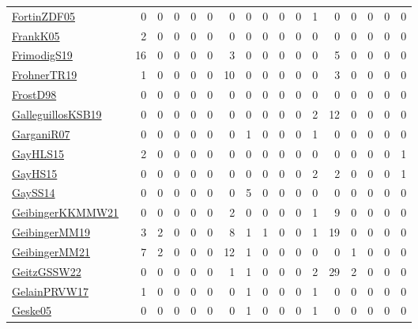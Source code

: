 {\begin{longtable}{l*{16}{r}}
\href{papers/FortinZDF05.pdf}{FortinZDF05}~\cite{FortinZDF05} & 0 & 0 & 0 & 0 & 0 & 0 & 0 & 0 & 0 & 0 & 1 & 0 & 0 & 0 & 0 & 0\\
\href{papers/FrankK05.pdf}{FrankK05}~\cite{FrankK05} & 2 & 0 & 0 & 0 & 0 & 0 & 0 & 0 & 0 & 0 & 0 & 0 & 0 & 0 & 0 & 0\\
\href{papers/FrimodigS19.pdf}{FrimodigS19}~\cite{FrimodigS19} & 16 & 0 & 0 & 0 & 0 & 3 & 0 & 0 & 0 & 0 & 0 & 5 & 0 & 0 & 0 & 0\\
\href{papers/FrohnerTR19.pdf}{FrohnerTR19}~\cite{FrohnerTR19} & 1 & 0 & 0 & 0 & 0 & 10 & 0 & 0 & 0 & 0 & 0 & 3 & 0 & 0 & 0 & 0\\
\href{papers/FrostD98.pdf}{FrostD98}~\cite{FrostD98} & 0 & 0 & 0 & 0 & 0 & 0 & 0 & 0 & 0 & 0 & 0 & 0 & 0 & 0 & 0 & 0\\
\href{papers/GalleguillosKSB19.pdf}{GalleguillosKSB19}~\cite{GalleguillosKSB19} & 0 & 0 & 0 & 0 & 0 & 0 & 0 & 0 & 0 & 0 & 2 & 12 & 0 & 0 & 0 & 0\\
\href{papers/GarganiR07.pdf}{GarganiR07}~\cite{GarganiR07} & 0 & 0 & 0 & 0 & 0 & 0 & 1 & 0 & 0 & 0 & 1 & 0 & 0 & 0 & 0 & 0\\
\href{papers/GayHLS15.pdf}{GayHLS15}~\cite{GayHLS15} & 2 & 0 & 0 & 0 & 0 & 0 & 0 & 0 & 0 & 0 & 0 & 0 & 0 & 0 & 0 & 1\\
\href{papers/GayHS15.pdf}{GayHS15}~\cite{GayHS15} & 0 & 0 & 0 & 0 & 0 & 0 & 0 & 0 & 0 & 0 & 2 & 2 & 0 & 0 & 0 & 1\\
\href{papers/GaySS14.pdf}{GaySS14}~\cite{GaySS14} & 0 & 0 & 0 & 0 & 0 & 0 & 5 & 0 & 0 & 0 & 0 & 0 & 0 & 0 & 0 & 0\\
\href{papers/GeibingerKKMMW21.pdf}{GeibingerKKMMW21}~\cite{GeibingerKKMMW21} & 0 & 0 & 0 & 0 & 0 & 2 & 0 & 0 & 0 & 0 & 1 & 9 & 0 & 0 & 0 & 0\\
\href{papers/GeibingerMM19.pdf}{GeibingerMM19}~\cite{GeibingerMM19} & 3 & 2 & 0 & 0 & 0 & 8 & 1 & 1 & 0 & 0 & 1 & 19 & 0 & 0 & 0 & 0\\
\href{papers/GeibingerMM21.pdf}{GeibingerMM21}~\cite{GeibingerMM21} & 7 & 2 & 0 & 0 & 0 & 12 & 1 & 0 & 0 & 0 & 0 & 0 & 1 & 0 & 0 & 0\\
\href{papers/GeitzGSSW22.pdf}{GeitzGSSW22}~\cite{GeitzGSSW22} & 0 & 0 & 0 & 0 & 0 & 1 & 1 & 0 & 0 & 0 & 2 & 29 & 2 & 0 & 0 & 0\\
\href{papers/GelainPRVW17.pdf}{GelainPRVW17}~\cite{GelainPRVW17} & 1 & 0 & 0 & 0 & 0 & 0 & 1 & 0 & 0 & 0 & 1 & 0 & 0 & 0 & 0 & 0\\
\href{papers/Geske05.pdf}{Geske05}~\cite{Geske05} & 0 & 0 & 0 & 0 & 0 & 0 & 1 & 0 & 0 & 0 & 1 & 0 & 0 & 0 & 0 & 0\\

\end{longtable}}
